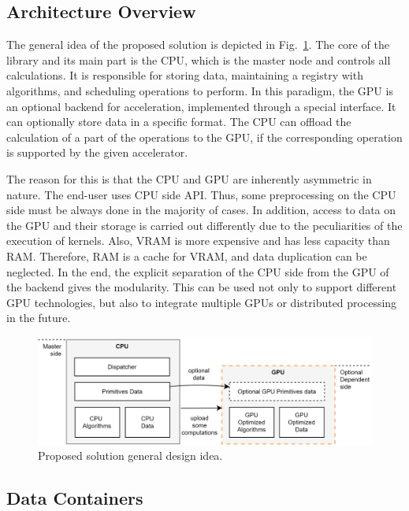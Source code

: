 \subsection{Architecture Overview}

The general idea of the proposed solution is depicted in Fig.~\ref{fig:design}. 
The core of the library and its main part is the CPU, which is the master node and controls all calculations. 
It is responsible for storing data, maintaining a registry with algorithms, and scheduling operations to perform. 
In this paradigm, the GPU is an optional backend for acceleration, implemented through a special interface. 
It can optionally store data in a specific format. 
The CPU can offload the calculation of a part of the operations to the GPU, if the corresponding operation is supported by the given accelerator.

The reason for this is that the CPU and GPU are inherently asymmetric in nature. 
The end-user uses CPU side API. Thus, some preprocessing on the CPU side must be always done in the majority of cases. In addition, access to data on the GPU and their storage is carried out differently due to the peculiarities of the execution of kernels. 
Also, VRAM is more expensive and has less capacity than RAM.
Therefore, RAM is a cache for VRAM, and data duplication can be neglected. 
In the end, the explicit separation of the CPU side from the GPU of the backend gives the modularity. 
This can be used not only to support different GPU technologies, but also to integrate multiple GPUs or distributed processing in the future.

\begin{figure}[t]
\centering
\includegraphics[width=0.95\linewidth]{figures/design_idea.png}
\caption{Proposed solution general design idea.}
\label{fig:design}
\end{figure}
    
\subsection{Data Containers}

